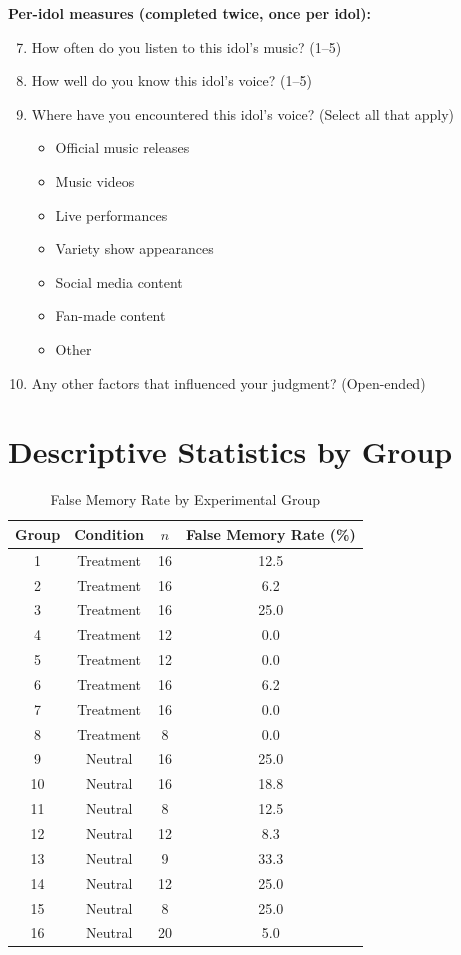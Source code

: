 \documentclass[12pt, a4paper]{article}
\begin{document}
\textbf{Per-idol measures (completed twice, once per idol):}
\begin{enumerate}
    \setcounter{enumi}{6}
    \item How often do you listen to this idol's music? (1--5)
    \item How well do you know this idol's voice? (1--5)
    \item Where have you encountered this idol's voice? (Select all that apply)
    \begin{itemize}
        \item Official music releases
        \item Music videos
        \item Live performances
        \item Variety show appearances
        \item Social media content
        \item Fan-made content
        \item Other
    \end{itemize}
    \item Any other factors that influenced your judgment? (Open-ended)
\end{enumerate}

\section{Descriptive Statistics by Group}

\begin{table}[H]
\centering
\caption{False Memory Rate by Experimental Group}
\begin{tabular}{cccc}
\toprule
Group & Condition & $n$ & False Memory Rate (\%) \\
\midrule
1 & Treatment & 16 & 12.5 \\
2 & Treatment & 16 & 6.2 \\
3 & Treatment & 16 & 25.0 \\
4 & Treatment & 12 & 0.0 \\
5 & Treatment & 12 & 0.0 \\
6 & Treatment & 16 & 6.2 \\
7 & Treatment & 16 & 0.0 \\
8 & Treatment & 8 & 0.0 \\
\midrule
9 & Neutral & 16 & 25.0 \\
10 & Neutral & 16 & 18.8 \\
11 & Neutral & 8 & 12.5 \\
12 & Neutral & 12 & 8.3 \\
13 & Neutral & 9 & 33.3 \\
14 & Neutral & 12 & 25.0 \\
15 & Neutral & 8 & 25.0 \\
16 & Neutral & 20 & 5.0 \\
\bottomrule
\end{tabular}
\end{table}
\end{document}
